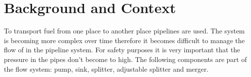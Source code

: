\documentclass[12pt]{report}
\begin{document}

\restoregeometry 
\nopagecolor

\begingroup
\let\cleardoublepage\relax
\let\clearpage\relax
\section*{Background and Context}
To transport fuel from one place to another place pipelines are used. The  system is becoming more complex over time therefore it becomes difficult to manage the flow of in the pipeline system. For safety purposes it is very important that the pressure in the pipes don't become to high. The following components are part of the flow system: pump, sink, splitter, adjustable splitter and merger.

\tableofcontents
\endgroup




\end{document}
